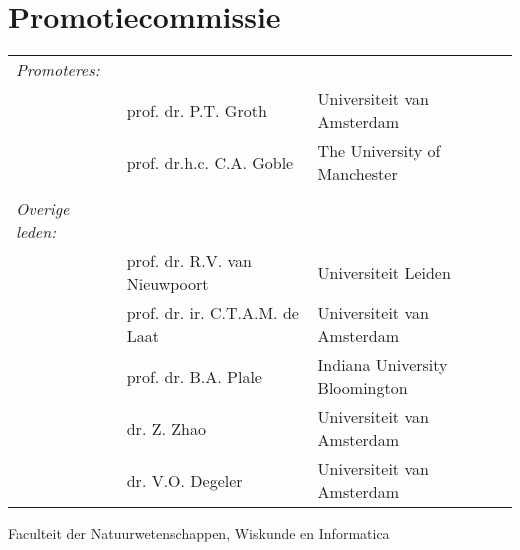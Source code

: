 \newpage

\section*{Promotiecommissie}

\begin{tabular}{lll}

\textit{Promoteres:}  &  & \\
     & prof. dr. P.T. Groth     & Universiteit van Amsterdam \\
     &  prof. dr.h.c. C.A. Goble & The University of Manchester \\
	& & \\     

\textit{Overige leden:} & & \\
     &  prof. dr. R.V. van Nieuwpoort   & Universiteit Leiden \\
     &  prof. dr. ir. C.T.A.M. de Laat  & Universiteit van Amsterdam \\
     &  prof. dr. B.A. Plale     & Indiana University Bloomington  \\     
     &  dr. Z. Zhao         & Universiteit van Amsterdam  \\     
     &  dr. V.O. Degeler     & Universiteit van Amsterdam \\
\end{tabular}

Faculteit der Natuurwetenschappen, Wiskunde en Informatica

